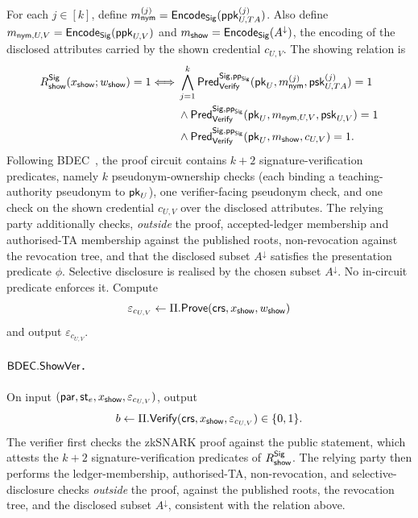 \begin{construction}
For each $j\in[k]$, define $m_{\mathsf{nym}}^{(j)}=\mathsf{Encode}_{\mathsf{Sig}}(\mathsf{ppk}_{U,TA}^{(j)})$.
Also define $m_{\mathsf{nym},U,V}=\mathsf{Encode}_{\mathsf{Sig}}(\mathsf{ppk}_{U,V})$ and $m_{\mathsf{show}}=\mathsf{Encode}_{\mathsf{Sig}}(A^\downarrow)$, the encoding of the disclosed attributes carried by the shown credential $c_{U,V}$. The showing relation is
\begin{equation*}
\begin{aligned}
R_{\mathsf{show}}^{\mathsf{Sig}}(x_{\mathsf{show}};w_{\mathsf{show}})=1
\Longleftrightarrow{}&
\bigwedge_{j=1}^{k}
\mathsf{Pred}_{\mathsf{Verify}}^{\mathsf{Sig},\mathsf{pp}_{\mathsf{Sig}}}
(\mathsf{pk}_U,m_{\mathsf{nym}}^{(j)},\mathsf{psk}_{U,TA}^{(j)})=1\\
&\land
\mathsf{Pred}_{\mathsf{Verify}}^{\mathsf{Sig},\mathsf{pp}_{\mathsf{Sig}}}
(\mathsf{pk}_U,m_{\mathsf{nym},U,V},\mathsf{psk}_{U,V})=1\\
&\land
\mathsf{Pred}_{\mathsf{Verify}}^{\mathsf{Sig},\mathsf{pp}_{\mathsf{Sig}}}
(\mathsf{pk}_U,m_{\mathsf{show}},c_{U,V})=1.
\end{aligned}
\end{equation*}
Following BDEC~\cite{10.1007/978-981-96-0957-4_3}, the proof circuit contains $k+2$ signature-verification predicates, namely $k$ pseudonym-ownership checks (each binding a teaching-authority pseudonym to $\mathsf{pk}_U$), one verifier-facing pseudonym check, and one check on the shown credential $c_{U,V}$ over the disclosed attributes. The relying party additionally checks, \emph{outside} the proof, accepted-ledger membership and authorised-TA membership against the published roots, non-revocation against the revocation tree, and that the disclosed subset $A^\downarrow$ satisfies the presentation predicate $\phi$. Selective disclosure is realised by the chosen subset $A^\downarrow$. No in-circuit predicate enforces it.
Compute
\begin{equation*}
  \varepsilon_{c_{U,V}}\leftarrow\Pi.\mathsf{Prove}(\mathsf{crs},x_{\mathsf{show}},w_{\mathsf{show}})
\end{equation*}
and output $\varepsilon_{c_{U,V}}$.

\paragraph{$\mathsf{BDEC}.\mathsf{ShowVer}$.}
On input $(\mathsf{par},\mathsf{st}_e,x_{\mathsf{show}},\varepsilon_{c_{U,V}})$, output
\begin{equation*}
  b\leftarrow\Pi.\mathsf{Verify}(\mathsf{crs},x_{\mathsf{show}},\varepsilon_{c_{U,V}})\in\{0,1\}.
\end{equation*}
The verifier first checks the zkSNARK proof against the public statement, which attests the $k+2$ signature-verification predicates of $R_{\mathsf{show}}^{\mathsf{Sig}}$. The relying party then performs the ledger-membership, authorised-TA, non-revocation, and selective-disclosure checks \emph{outside} the proof, against the published roots, the revocation tree, and the disclosed subset $A^\downarrow$, consistent with the relation above.


\end{construction}
